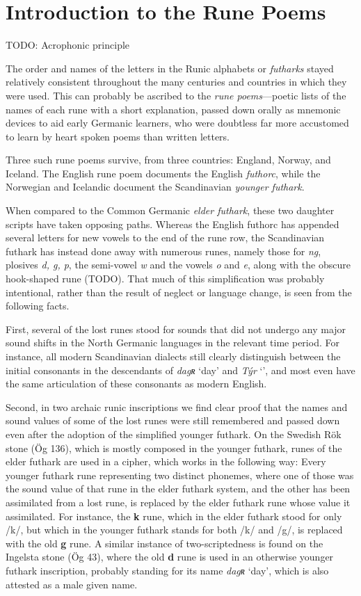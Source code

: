 \section{Introduction to the Rune Poems}

TODO: Acrophonic principle

The order and names of the letters in the Runic alphabets or \emph{futharks} stayed relatively consistent throughout the many centuries and countries in which they were used.  This can probably be ascribed to the \emph{rune poems}—poetic lists of the names of each rune with a short explanation, passed down orally as mnemonic devices to aid early Germanic learners, who were doubtless far more accustomed to learn by heart spoken poems than written letters.

Three such rune poems survive, from three countries: England, Norway, and Iceland.  The English rune poem documents the English \emph{futhorc}, while the Norwegian and Icelandic document the Scandinavian \emph{younger futhark}.

When compared to the Common Germanic \emph{elder futhark}, these two daughter scripts have taken opposing paths.  Whereas the English futhorc has appended several letters for new vowels to the end of the rune row, the Scandinavian futhark has instead done away with numerous runes, namely those for \emph{ng}, plosives \emph{d, g, p}, the semi-vowel \emph{w} and the vowels \emph{o} and \emph{e}, along with the obscure hook-shaped rune (TODO).  That much of this simplification was probably intentional, rather than the result of neglect or language change, is seen from the following facts.

First, several of the lost runes stood for sounds that did not undergo any major sound shifts in the North Germanic languages in the relevant time period.  For instance, all modern Scandinavian dialects still clearly distinguish between the initial consonants in the descendants of \emph{dagʀ} ‘day’ and \emph{Týr} ‘’, and most even have the same articulation of these consonants as modern English.

Second, in two archaic runic inscriptions we find clear proof that the names and sound values of some of the lost runes were still remembered and passed down even after the adoption of the simplified younger futhark.  On the Swedish Rök stone (Ög 136), which is mostly composed in the younger futhark, runes of the elder futhark are used in a cipher, which works in the following way: Every younger futhark rune representing two distinct phonemes, where one of those was the sound value of that rune in the elder futhark system, and the other has been assimilated from a lost rune, is replaced by the elder futhark rune whose value it assimilated.  For instance, the \textbf{k} rune, which in the elder futhark stood for only /k/, but which in the younger futhark stands for both /k/ and /g/, is replaced with the old \textbf{g} rune.  A similar instance of two-scriptedness is found on the Ingelsta stone (Ög 43), where the old \textbf{d} rune is used in an otherwise younger futhark inscription, probably standing for its name \emph{dagʀ} ‘day’, which is also attested as a male given name.

